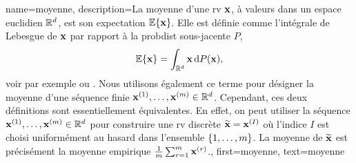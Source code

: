 {name={moyenne},
	description={La  moyenne d’une \gls{rv} ${\bf x}$, à valeurs dans un espace euclidien $\mathbb{R}^{d}$, est son 
		\gls{expectation} $\mathbb{E}\{{\bf x}\}$. Elle est définie comme l'intégrale de Lebesgue 
		de ${\bf x}$ par rapport à la \gls{probdist} sous-jacente $P$,
		\[
		\mathbb{E}\{{\bf x}\} = \int_{\mathbb{R}^{d}} {\bf x} \, \mathrm{d}P({\bf x}),
		\]
		voir par exemple \cite{BillingsleyProbMeasure} ou \cite{RudinBookPrinciplesMatheAnalysis}. 
		Nous utilisons également ce terme pour désigner la moyenne d’une séquence finie 
		${\bf x}^{(1)}, \ldots, {\bf x}^{(m)} \in \mathbb{R}^{d}$. Cependant, 
		ces deux définitions sont essentiellement équivalentes. En effet, on peut utiliser la séquence 
		${\bf x}^{(1)}, \ldots, {\bf x}^{(m)} \in \mathbb{R}^{d}$ pour construire une 
		\gls{rv} discrète $\widetilde{{\bf x}}={\bf x}^{(I)}$ où l’indice $I$ est choisi uniformément 
		au hasard dans l’ensemble $\{1,\ldots,m\}$. La moyenne de $\widetilde{{\bf x}}$ est 
		précisément la moyenne empirique $\frac{1}{m} \sum_{r=1}^{m} {\bf x}^{(r)}$.},
	first={moyenne}, text={moyenne}
}

